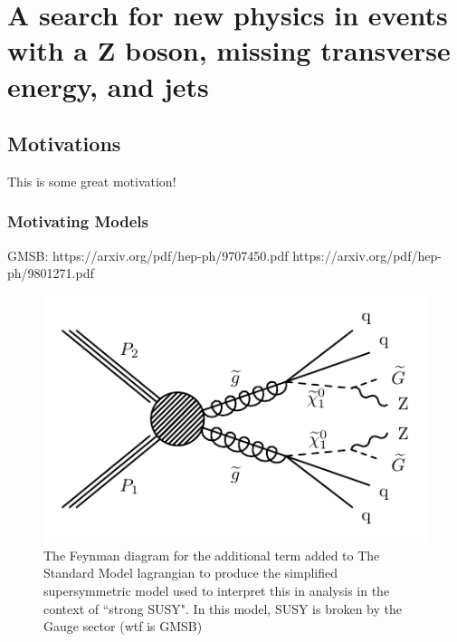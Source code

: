 \chapter{A search for new physics in events with a Z boson, missing transverse energy, and jets}

\section{Motivations}

  This is some great motivation!

  \subsection{Motivating Models} \label{sec:susy_models}

  GMSB: https://arxiv.org/pdf/hep-ph/9707450.pdf
  https://arxiv.org/pdf/hep-ph/9801271.pdf

  \begin{figure}[h!]
    \centering
    \includegraphics[width=.5\textwidth]{figures/diagrams/T5ZZ.pdf}
    \caption{The Feynman diagram for the additional term added to The Standard Model lagrangian to produce the simplified supersymmetric model used to interpret this in analysis in the context of ``strong SUSY". In this model, SUSY is broken by the Gauge sector (wtf is GMSB) }
    \label{fig:feynman_str}
  \end{figure}

